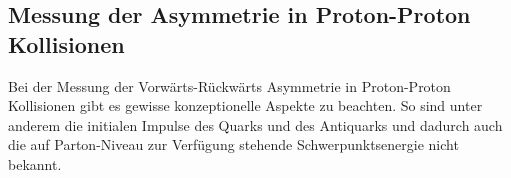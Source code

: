 \subsection{Messung der Asymmetrie in Proton-Proton Kollisionen}
\label{theory:afb_hadron_collider}


Bei der Messung der Vorwärts-Rückwärts Asymmetrie in Proton-Proton Kollisionen
gibt es gewisse konzeptionelle Aspekte zu beachten. So sind unter anderem die
initialen Impulse des Quarks und des Antiquarks und dadurch auch die auf
Parton-Niveau zur Verfügung stehende Schwerpunktsenergie nicht bekannt.








